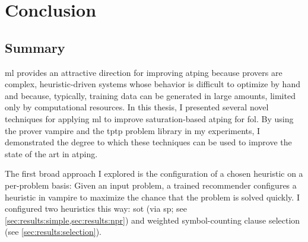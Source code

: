 \chapter{Conclusion}




\section{Summary}

\Gls{ml} provides an attractive direction for improving \gls{atping}
because provers are complex, heuristic-driven systems whose behavior is difficult to optimize by hand
and because, typically, training data can be generated in large amounts, limited only by computational resources.
In this thesis,
I presented several novel techniques for applying \gls{ml} to improve saturation-based \gls{atping} for \gls{fol}.
By using the prover \gls{vampire} and the \gls{tptp} problem library in my experiments,
I demonstrated the degree to which these techniques can be used to improve the state of the art in \gls{atping}.

The first broad approach I explored is the configuration of a chosen heuristic on a per-problem basis:
Given an input problem, a trained recommender configures a heuristic in \gls{vampire} to maximize the chance that the problem is solved quickly.
I configured two heuristics this way:
\gls{sot} (via \gls{sp}; see \cref{sec:results:simple,sec:results:npr}) and weighted symbol-counting clause selection (see \cref{sec:results:selection}).


